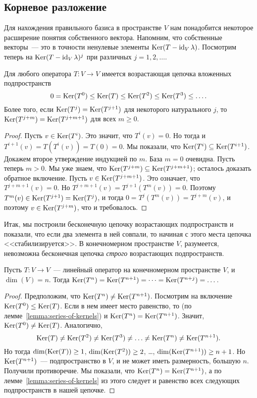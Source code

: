 \subsection{Корневое разложение}



Для нахождения правильного базиса в пространстве $V$ нам понадобится
некоторое расширение понятия собственного вектора.
Напомним, что собственные векторы~--- это в точности ненулевые
элементы $\operatorname{Ker}(T-\operatorname{id}_V\lambda)$. Посмотрим теперь
на $\operatorname{Ker}(T-\operatorname{id}_V\lambda)^j$ при различных $j=1,2,\dots$.
\begin{lemma}\label{lemma:series-of-kernels}
Для любого оператора $T\colon V\to V$ имеется
возрастающая цепочка вложенных подпространств
$$
0 = \operatorname{Ker}(T^0) \leq \operatorname{Ker}(T) \leq \operatorname{Ker}(T^2) \leq \operatorname{Ker}(T^3) \leq \dots.
$$
Более того, если $\operatorname{Ker}(T^j) = \operatorname{Ker}(T^{j+1})$ для некоторого
натурального $j$, то $\operatorname{Ker}(T^{j+m})=\operatorname{Ker}(T^{j+m+1})$ для всех $m\geq0$.
\end{lemma}
\begin{proof}
Пусть $v\in\operatorname{Ker}(T^i)$. Это значит, что $T^i(v)=0$.
Но тогда и $T^{i+1}(v)=T(T^i(v)) = T(0)=0$.
Мы показали, что $\operatorname{Ker}(T^i)\subseteq\operatorname{Ker}(T^{i+1})$.
Докажем второе утверждение индукцией по $m$. База $m=0$ очевидна.
Пусть теперь $m>0$. Мы уже знаем, что $\operatorname{Ker}(T^{j+m})\subseteq
\operatorname{Ker}(T^{j+m+1})$; осталось доказать обратное включение.
Пусть $v\in\operatorname{Ker}(T^{j+m+1})$. Это означает, что
$T^{j+m+1}(v)=0$. Но $T^{j+m+1}(v) = T^{j+1}(T^m(v)) = 0$.
Поэтому $T^m(v)\in\operatorname{Ker}(T^{j+1}) = \operatorname{Ker}(T^j)$,
и тогда $0 = T^j(T^m(v)) = T^{j+m}(v)$, и поэтому
$v\in\operatorname{Ker}(T^{j+m})$, что и требовалось.
\end{proof}

Итак, мы построили бесконечную цепочку возрастающих подпространств
и показали, что если два элемента в ней совпали, то начиная
с этого места цепочка <<стабилизируется>>.
В конечномерном пространстве $V$, разумеется, невозможна
бесконечная цепочка {\em строго} возрастающих подпространств.
\begin{proposition}\label{prop:nilpotence-degree-is-bounded}
Пусть $T\colon V\to V$~--- линейный оператор на конечномерном
пространстве $V$, и $\dim(V) = n$. Тогда
$\operatorname{Ker}(T^n) = \operatorname{Ker}(T^{n+1}) = \dots = \operatorname{Ker}(T^{n+j}) = \dots$.
\end{proposition}
\begin{proof}
Предположим, что $\operatorname{Ker}(T^n)\neq\operatorname{Ker}(T^{n+1})$.
Посмотрим на включение $\operatorname{Ker}(T^0)\leq\operatorname{Ker}(T)$.
Если в нем имеет место равенство, то
(по лемме~\ref{lemma:series-of-kernels}) и $\operatorname{Ker}(T^n)=\operatorname{Ker}(T^{n+1})$.
Значит, $\operatorname{Ker}(T^0)\neq \operatorname{Ker}(T)$. Аналогично,
$$
\operatorname{Ker}(T)\neq\operatorname{Ker}(T^2)\neq\operatorname{Ker}(T^3)\neq\dots\neq\operatorname{Ker}(T^n)\neq\operatorname{Ker}(T^{n+1}).
$$
Но тогда $\dim(\operatorname{Ker}(T))\geq 1$, $\dim(\operatorname{Ker}(T^2))\geq 2$, \dots,
$\dim(\operatorname{Ker}(T^{n+1})) \geq n+1$. Но $\operatorname{Ker}(T^{n+1})$~--- подпространство
в $V$, и не может иметь размерность, большую $n$.
Получили противоречие.
Мы показали, что $\operatorname{Ker}(T^n) = \operatorname{Ker}(T^{n+1})$, а
по лемме~\ref{lemma:series-of-kernels} из этого следует
и равенство всех следующих подпространств в нашей цепочке.
\end{proof}


